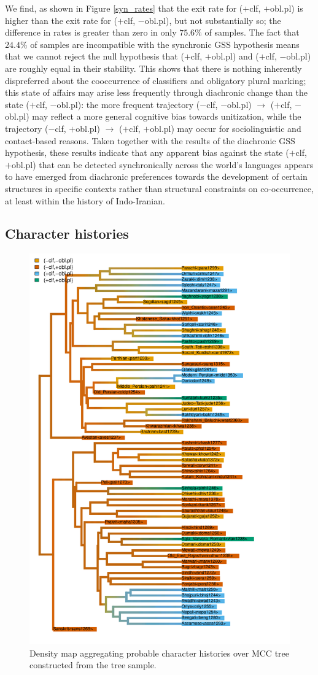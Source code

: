 \documentclass[11pt]{article}
\begin{document}
We find, as shown in Figure \ref{syn_rates} that the exit rate for {\sc ($+$clf, $+$obl.pl)} is higher than the exit rate for {\sc ($+$clf, $-$obl.pl)}, but not substantially so; the difference in rates is greater than zero in only $75.6\%$ of samples. 
The fact that $24.4\%$ of samples are incompatible with the synchronic GSS hypothesis means that we cannot reject the null hypothesis that {\sc ($+$clf, $+$obl.pl)} and {\sc ($+$clf, $-$obl.pl)} are roughly equal in their stability. This shows that there is nothing inherently dispreferred about the cooccurrence of classifiers and obligatory plural marking; this state of affairs may arise less frequently through diachronic change than the state {\sc ($+$clf, $-$obl.pl)}: the more frequent trajectory {\sc ($-$clf, $-$obl.pl) $\rightarrow$ ($+$clf, $-$obl.pl)} may reflect a more general cognitive bias towards unitization, while the trajectory {\sc ($-$clf, $+$obl.pl) $\rightarrow$ ($+$clf, $+$obl.pl)} may occur for sociolinguistic and contact-based reasons. 
Taken together with the results of the diachronic GSS hypothesis, these results indicate that any apparent bias against the state {\sc ($+$clf, $+$obl.pl)} that can be detected synchronically across the world's languages appears to have emerged from diachronic preferences towards the development of certain structures in specific contexts rather than structural constraints on co-occurrence, at least within the history of Indo-Iranian.

\subsection{Character histories}
\label{SCM}

\begin{figure}[h!]
\centering
\includegraphics[width=.7\linewidth]{code/density_map.pdf}
\caption{Density map aggregating probable character histories over MCC tree constructed from the tree sample.}
\label{densitymap}
\end{figure}
\end{document}
